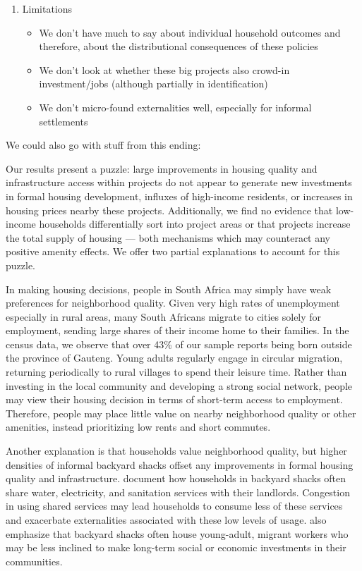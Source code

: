 \documentclass[12pt]{article}
\begin{document}
\begin{enumerate}
\item Limitations

\begin{itemize}
\item We don't have much to say about individual household outcomes and therefore, about the distributional consequences of these policies
\item We don't look at whether these big projects also crowd-in investment/jobs (although partially in identification)
\item We don't micro-found externalities well, especially for informal settlements
\end{itemize}

\end{enumerate}

We could also go with stuff from this ending:

Our results present a puzzle: large improvements in housing quality and infrastructure access within projects do not appear to generate new investments in formal housing development, influxes of high-income residents, or increases in housing prices nearby these projects.  Additionally, we find no evidence that low-income households differentially sort into project areas or that projects increase the total supply of housing --- both mechanisms which may counteract any positive amenity effects.  We offer two partial explanations to account for this puzzle.

In making housing decisions, people in South Africa may simply have weak preferences for neighborhood quality.  Given very high rates of unemployment especially in rural areas, many South Africans migrate to cities solely for employment, sending large shares of their income home to their families.  In the census data, we observe that over 43\% of our sample reports being born outside the province of Gauteng.  Young adults regularly engage in circular migration, returning periodically to rural villages to spend their leisure time.  Rather than investing in the local community and developing a strong social network, people may view their housing decision in terms of short-term access to employment.  Therefore, people may place little value on nearby neighborhood quality or other amenities, instead prioritizing low rents and short commutes. 

Another explanation is that households value neighborhood quality, but higher densities of informal backyard shacks offset any improvements in formal housing quality and infrastructure.  \cite{Brueckner2018backyarding} document how households in backyard shacks often share water, electricity, and sanitation services with their landlords.  Congestion in using shared services may lead households to consume less of these services and exacerbate externalities associated with these low levels of usage.  \cite{Brueckner2018backyarding} also emphasize that backyard shacks often house young-adult, migrant workers who may be less inclined to make long-term social or economic investments in their communities.  
\end{document}
